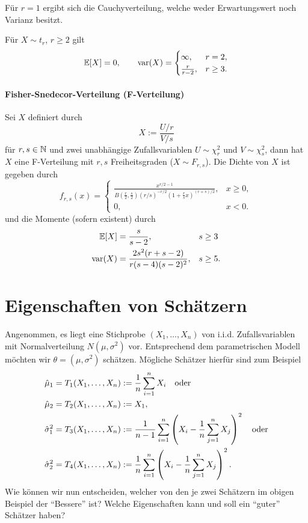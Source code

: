 Für $r = 1$ ergibt sich die Cauchyverteilung, welche weder Erwartungswert noch
Varianz besitzt.

Für $X \sim t_r$, $r \ge 2$ gilt
\[ \mathbb{E}[X] = 0, \qquad \operatorname{var}(X) = \begin{cases}
    \infty, & r = 2, \\
  \frac{r}{r-2}, & r \ge 3. 
\end{cases} \]

\paragraph{Fisher-Snedecor-Verteilung (F-Verteilung)}
Sei $X$ definiert durch
\[ X := \frac{U/r}{V/s} \]
für $r,s \in \mathbb{N}$ und zwei unabhängige Zufallsvariablen $U \sim \chi_r^2$ und
$V \sim \chi_s^2$, dann hat $X$ eine F-Verteilung mit $r,s$ Freiheitsgraden ($X
\sim F_{r,s}$). Die Dichte von $X$ ist gegeben durch
\[ f_{r,s}(x) = \begin{cases}
    \frac {x^{r/2 - 1}}{B\left( \frac{r}{2}, \frac{s}{2} \right) (r/s)^{-r/2}
      \left( 1 + \frac{r}{s} x \right)^{(r+s)/2}}, & x \ge 0, \\
    0, & x < 0.
  \end{cases}
\]
und die Momente (sofern existent) durch
\[ \begin{aligned}
    \mathbb{E}[X] &= \frac{s}{s-2}, & s &\ge 3 \\
    \operatorname{var}(X) &= \frac{2s^2 (r+s-2)}{r(s-4)(s-2)^2}, & s &\ge 5.
  \end{aligned}
\]

\section{Eigenschaften von Schätzern}
\begin{exmp}
  Angenommen, es liegt eine Stichprobe $(X_1, \ldots, X_n)$ von i.i.d.
  Zufallsvariablen mit Normalverteilung $N(\mu,\sigma^2)$ vor. Entsprechend dem
  parametrischen Modell möchten wir $\theta = (\mu,\sigma^2)$ schätzen. Mögliche
  Schätzer hierfür sind zum Beispiel
  \begin{align*}
    \hat{\mu}_1 &= T_1(X_1, \ldots, X_n) := \frac{1}{n} \sum_{i=1}^n X_i \quad
    \text{oder} \\
    \hat{\mu}_2 &= T_2(X_1, \ldots, X_n) := X_1, \\
    \hat{\sigma}^2_1 &= T_3(X_1, \ldots, X_n) := \frac{1}{n-1} \sum_{i=1}^n \left( X_i - \frac{1}{n} \sum_{j=1}^n X_j \right)^2 \quad
                       \text{oder} \\
    \hat{\sigma}^2_2 &= T_4(X_1, \ldots, X_n) := \frac{1}{n} \sum_{i=1}^n \left( X_i - \frac{1}{n} \sum_{j=1}^n X_j \right)^2.
  \end{align*}
  Wie können wir nun entscheiden, welcher von den je zwei Schätzern im obigen
  Beispiel der ``Bessere'' ist? Welche Eigenschaften kann und soll ein ``guter''
  Schätzer haben?
\end{exmp}


